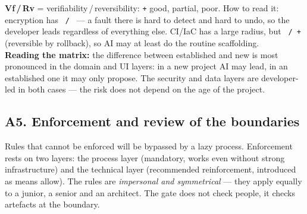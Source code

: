\medskip
\begin{calloutplain}[grey]
\textbf{Vf\,/\,Rv} = verifiability\,/\,reversibility: \mbox{\texttt{+}} good, \mbox{\texttt{\sympart{}}} partial, \mbox{\texttt{\sympoor{}}} poor.
How to read it: encryption has \mbox{\texttt{\sympoor{}\,/\,\sympoor{}}} --- a fault there is hard to detect and hard to undo, so the developer leads regardless of everything else.
CI/IaC has a large radius, but \mbox{\texttt{\sympart{}\,/\,+}} (reversible by rollback), so AI may at least do the routine scaffolding.\\[4pt]
\textbf{Reading the matrix:} the difference between established and new is most pronounced in the domain and UI layers: in a new project AI may lead, in an established one it may only propose.
The security and data layers are developer-led in both cases --- the risk does not depend on the age of the project.
\end{calloutplain}

\subsection{A5. Enforcement and review of the boundaries}

Rules that cannot be enforced will be bypassed by a lazy process.
Enforcement rests on two layers: the process layer (mandatory, works even without strong infrastructure) and the technical layer (recommended reinforcement, introduced as means allow).
The rules are \emph{impersonal and symmetrical} --- they apply equally to a junior, a senior and an architect. The gate does not check people, it checks artefacts at the boundary.

